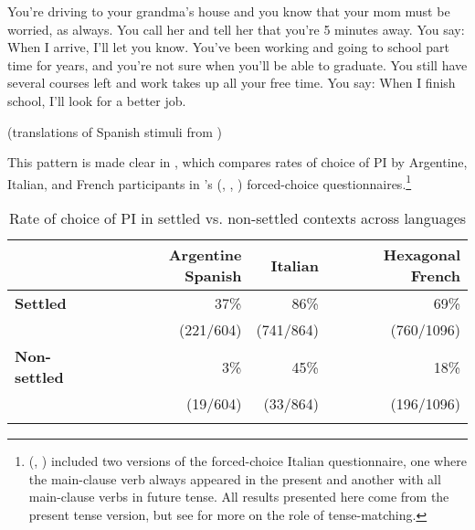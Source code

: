 \documentclass[output=paper,colorlinks,citecolor=brown]{langscibook}
\begin{document}
\begin{exe}
\ex
\begin{xlist}
\ex\label{ex:hoff:grandma}
You’re driving to your grandma’s house and you know that your mom must be worried, as always. You call her and tell her that you’re 5 minutes away. You say: When I arrive, I’ll let you know. 
\ex\label{ex:hoff:graduate}
You’ve been working and going to school part time for years, and you’re not sure when you’ll be able to graduate. You still have several courses left and work takes up all your free time. You say: When I finish school, I’ll look for a better job.
\end{xlist}
(translations of Spanish stimuli from \citealt{Hoff2019})
\end{exe}

This pattern is made clear in , which compares rates of choice of PI by Argentine, Italian, and French participants in \citeauthor{Hoff2019}’s (\citeyear{Hoff2019}, \citeyear{Hoff2020}, \citeyear{HoffForthcoming}) forced-choice questionnaires.\footnote{\citeauthor{Hoff2019} (\citeyear{Hoff2019}, \citeyear{Hoff2020}) included two versions of the forced-choice Italian questionnaire, one where the main-clause verb always appeared in the present and another with all main-clause verbs in future tense. All results presented here come from the present tense version, but see \citet{Hoff2020} for more on the role of tense-matching.}

\begin{table}
\begin{tabular}{lrrr}
\lsptoprule
& \textbf{Argentine Spanish} & \textbf{Italian} & \textbf{Hexagonal French} \\
\midrule
\textbf{Settled} & 37\% & 86\% & 69\% \\
& (221/604) & (741/864) & (760/1096) \\
\textbf{Non-settled} & 3\% & 45\% &18\%  \\
& (19/604) & (33/864) & (196/1096) \\
\lspbottomrule
\caption{Rate of choice of PI in settled vs. non-settled contexts across languages}
\label{tab:hoff:rates}
\end{tabular}
\end{table}
\end{document}
